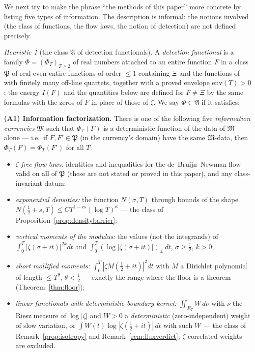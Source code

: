 \documentclass[11pt]{amsart}
\theoremstyle{plain}
\theoremstyle{definition}
\theoremstyle{remark}
\newtheorem{heuristic}[theorem]{Heuristic}
\begin{document}
We next try to make the phrase ``the methods of this paper'' more concrete by listing five types of information. The description is informal: the notions involved (the class of functions, the flow laws, the notion of detection) are not defined precisely.

\begin{heuristic}[the class $\mathfrak A$ of detection functionals]\label{def:classA}
A \emph{detection functional} is a family $\Phi=(\Phi_T)_{T\ge2}$ of real numbers attached to an entire function $F$ in a class $\mathfrak P$ of real even entire functions of order $\le1$ containing $\Xi$ and the functions of \cite[\S2.3]{P30} with finitely many off-line quartets, together with a proved envelope $\mathrm{env}(T)>0$; the energy $I(F)$ and the quantities below are defined for $F\ne\Xi$ by the same formulas with the zeros of $F$ in place of those of $\zeta$. We say $\Phi\in\mathfrak A$ if it satisfies:

\textbf{(A1) Information factorization.} There is one of the following five \emph{information currencies} $\mathfrak M$ such that $\Phi_T(F)$ is a deterministic function of the data of $\mathfrak M$ alone --- i.e.\ if $F,F'\in\mathfrak P$ \textup{(}in the currency's domain\textup{)} have the same $\mathfrak M$-data, then $\Phi_T(F)=\Phi_T(F')$ for all $T$:
\begin{itemize}
\item[\textup{(i)}] \emph{$\zeta$-free flow laws:} identities and inequalities for the de~Bruijn--Newman flow valid on all of $\mathfrak P$ \textup{(}these are not stated or proved in this paper\textup{)}, and any class-invariant datum;
\item[\textup{(ii)}] \emph{exponential densities:} the function $N(\sigma,T)$ through bounds of the shape $N(\tfrac12+s,T)\le CT^{1-cs}(\log T)^\kappa$ --- the class of Proposition~\ref{prop:densitybarrier};
\item[\textup{(iii)}] \emph{vertical moments of the modulus:} the values \textup{(}not the integrands\textup{)} of $\int_0^T|\zeta(\sigma+it)|^{2k}dt$ and $\int_0^T(\log|\zeta(\sigma+it)|)_\pm\,dt$, $\sigma\ge\tfrac12$, $k>0$;
\item[\textup{(iv)}] \emph{short mollified moments:} $\int_0^T|\zeta M(\tfrac12+it)|^2dt$ with $M$ a Dirichlet polynomial of length $\le T^\theta$, \emph{$\theta<\tfrac12$} --- exactly the range where the floor is a theorem \textup{(}Theorem~\ref{thm:floor}\textup{)};
\item[\textup{(v)}] \emph{linear functionals with deterministic boundary kernel:} $\iint_{R_T}W\,d\nu$ with $\nu$ the Riesz measure of $\log|\zeta|$ and $W>0$ a \emph{deterministic} \textup{(}zero-independent\textup{)} weight of slow variation, or $\int W(t)\log|\zeta(\tfrac12+it)|\,dt$ with such $W$ --- the class of Remark~\ref{prop:isotropy} and Remark~\ref{rem:fluxverdict}; $\zeta$-correlated weights are excluded.
\end{itemize}


\end{heuristic}
\end{document}
